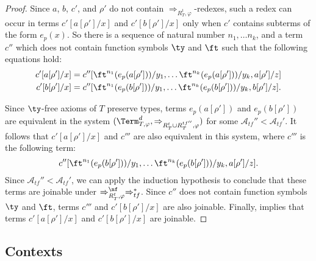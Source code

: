 \begin{proof}
Since $a$, $b$, $c'$, and $\rho'$ do not contain $\Rightarrow_{R_T^t,\varphi}$-redexes, such a redex can occur in terms $c'[a[\rho']/x]$ and $c'[b[\rho']/x]$ only when $c'$ contains subterms of the form $e_p(x)$.
So there is a sequence of natural number $n_1, \ldots n_k$, and a term $c''$ which does not contain function symbols $\ty$ and $\ft$ such that the following equations hold:
\begin{align*}
c'[a[\rho']/x] & = c''[\ft^{n_1}(e_p(a[\rho']))/y_1, \ldots \ft^{n_k}(e_p(a[\rho']))/y_k, a[\rho']/z] \\
c'[b[\rho']/x] & = c''[\ft^{n_1}(e_p(b[\rho']))/y_1, \ldots \ft^{n_k}(e_p(b[\rho']))/y_k, b[\rho']/z].
\end{align*}

Since $\ty$-free axioms of $T$ preserve types, terms $e_p(a[\rho'])$ and $e_p(b[\rho'])$ are equivalent in the system $(\Term_{T,\varphi}^d,\Rightarrow_{R^t_T \cup R^{tf''}_T, \varphi})$ for some $\mathcal{A}_{tf}'' < \mathcal{A}_{tf}'$.
It follows that $c'[a[\rho']/x]$ and $c'''$ are also equivalent in this system, where $c'''$ is the following term:
\[ c''[\ft^{n_1}(e_p(b[\rho']))/y_1, \ldots \ft^{n_k}(e_p(b[\rho']))/y_k, a[\rho']/z]. \]
Since $\mathcal{A}_{tf}'' < \mathcal{A}_{tf}'$, we can apply the induction hypothesis to conclude that these terms are joinable under $\Rightarrow_{R_T^t,\varphi}^\nf \Rightarrow_{tf}^*$.
Since $c''$ does not contain function symbols $\ty$ and $\ft$, terms $c'''$ and $c'[b[\rho']/x]$ are also joinable.
Finally,  implies that terms $c'[a[\rho']/x]$ and $c'[b[\rho']/x]$ are joinable.
\end{proof}

\subsection{Contexts}

